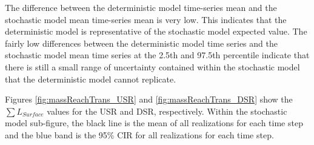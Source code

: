 \begin{linenumbers}
The difference between the deterministic model time-series mean and the stochastic model mean time-series mean is very low.  This indicates that the deterministic model is representative of the stochastic model expected value.  The fairly low differences between the deterministic model time series and the stochastic model mean time series at the 2.5th and 97.5th percentile indicate that there is still a small range of uncertainty contained within the stochastic model that the deterministic model cannot replicate.


Figures \ref{fig:massReachTrans_USR} and \ref{fig:massReachTrans_DSR} show the $ \sum L_{Surface} $ values for the USR and DSR, respectively.  Within the stochastic model sub-figure, the black line is the mean of all realizations for each time step and the blue band is the 95\% CIR for all realizations for each time step.


\end{linenumbers}
